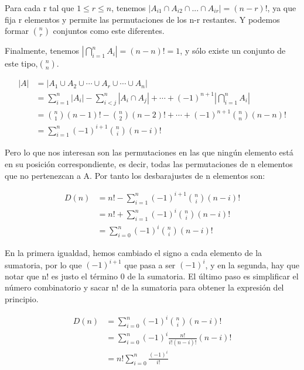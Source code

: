 \documentclass[12pt,spanish]{article}
\theoremstyle{definition}
\theoremstyle{remark}
\begin{document}
\begin{justify}
  Para cada r tal que $1\leq r \leq n$, tenemos $|A_{i1}\cap
  A_{i2}\cap...\cap A_{ir}|=(n-r)!$, ya que fija r elementos y permite
  las permutaciones de los n-r restantes. Y podemos formar
  $\binom{n}{r}$ conjuntos como este diferentes.
\end{justify}

\begin{justify}
  Finalmente, tenemos $|\bigcap\limits_{i=1}^n A_i|=(n-n)!=1$, y sólo
  existe un conjunto de este tipo,$\binom{n}{n}$.
\end{justify}

\begin{align*}
  |A|&=|A_1\cup A_2\cup\cdots\cup A_r \cup\cdots\cup A_n|\\
  &=\sum\limits_{i=1}^n|A_i|-\sum\limits_{i<j}^n|A_i\cap A_j|+\cdots+(-1)^{n+1}|\bigcap\limits_{i=1}^nA_i|\\
  &=\binom{n}{1}(n-1)!-\binom{n}{2}(n-2)!+\cdots+(-1)^{n+1}\binom{n}{n}(n-n)!\\
  &=\sum\limits_{i=1}^n(-1)^{i+1}\binom{n}{i}(n-i)!
\end{align*}

\begin{justify}
  Pero lo que nos interesan son las permutaciones en las que ningún
  elemento está en su posición correspondiente, es decir, todas las
  permutaciones de n elementos que no pertenezcan a A. Por tanto los
  desbarajustes de n elementos son:
\end{justify}

\begin{align*}
  D(n)&=n!-\sum\limits_{i=1}^n(-1)^{i+1}\binom{n}{i}(n-i)!\\
  &=n!+\sum\limits_{i=1}^n(-1)^i\binom{n}{i}(n-i)!\\
  &=\sum\limits_{i=0}^n(-1)^i\binom{n}{i}(n-i)!
\end{align*}

\begin{justify}
  En la primera igualdad, hemos cambiado el signo a cada elemento de
  la sumatoria, por lo que $(-1)^{i+1}$ que pasa a ser $(-1)^i$, y en
  la segunda, hay que notar que n! es justo el término 0 de la
  sumatoria. El último paso es simplificar el número combinatorio y
  sacar n! de la sumatoria para obtener la expresión del principio.
\end{justify}

\begin{align*}
  D(n)&=\sum\limits_{i=0}^n(-1)^i\binom{n}{i}(n-i)!\\
  &=\sum\limits_{i=0}^n(-1)^i\frac{n!}{i!(n-i)!}(n-i)!\\
  &=n!\sum\limits_{i=0}^n\frac{(-1)^i}{i!}
\end{align*}
\end{document}
